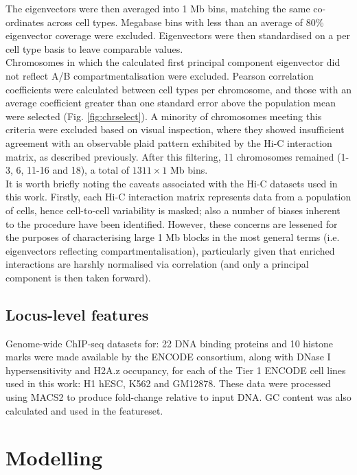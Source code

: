\documentclass[a4paper]{report}
\begin{document}
The eigenvectors were then averaged into 1 Mb bins, matching the same
co-ordinates across cell types. Megabase bins with less than an
average of $80\%$ eigenvector coverage were excluded. Eigenvectors
were then standardised on a per cell type basis to leave comparable
values.\\

Chromosomes in which the calculated first principal component
eigenvector did not reflect A/B compartmentalisation were
excluded. Pearson correlation coefficients were calculated between cell types per
chromosome, and those with an average coefficient greater than one
standard error above the population mean were selected
(Fig. \ref{fig:chrselect}). A minority of chromosomes meeting this criteria were
excluded based on visual inspection, where they showed insufficient agreement with an
observable plaid pattern exhibited by the Hi-C interaction matrix, as
described previously.\cite{Lieberman2011} After this filtering, 11
chromosomes remained (1-3, 6, 11-16 and 18), a total of
$1311\times1$ Mb bins. \\

It is worth briefly noting the caveats associated with the Hi-C datasets used
in this work. Firstly, each Hi-C interaction matrix represents data from
a population of cells, hence cell-to-cell variability is
masked; also a number of biases inherent to the procedure have been
identified.\cite{Yaffe2011, Imakaev2012} However, these concerns are lessened for the purposes of
characterising large 1 Mb blocks in the most general terms (i.e. eigenvectors reflecting compartmentalisation), particularly given that enriched interactions
are harshly normalised via correlation (and only a principal component
is then taken forward). \\

\subsection{Locus-level features}
Genome-wide ChIP-seq datasets for: 22 DNA binding proteins and 10 histone marks were made
available by the ENCODE consortium,\cite{Dunham2012} along with DNase
I hypersensitivity and H2A.z occupancy, for each of the Tier 1 ENCODE
cell lines used in this work: H1 hESC, K562 and GM12878. These data were
processed using MACS2\cite{Zhang2008} to produce fold-change relative
to input DNA. GC content was also calculated and used in the
featureset.

\section{Modelling}
\end{document}
